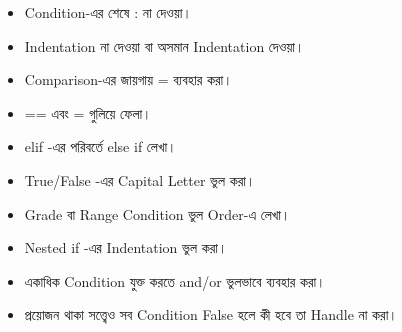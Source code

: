 

\begin{rememberbox}

\begin{itemize}

\item Condition-এর শেষে
\textenglish{\ttfamily :}
না দেওয়া।

\item Indentation না দেওয়া বা অসমান Indentation দেওয়া।

\item Comparison-এর জায়গায়
\textenglish{\ttfamily =}
ব্যবহার করা।

\item
\textenglish{\ttfamily ==}
এবং
\textenglish{\ttfamily =}
গুলিয়ে ফেলা।

\item
\textenglish{\ttfamily elif}
-এর পরিবর্তে
\textenglish{\ttfamily else if}
লেখা।

\item
\textenglish{\ttfamily True/False}
-এর Capital Letter ভুল করা।

\item Grade বা Range Condition ভুল Order-এ লেখা।

\item Nested
\textenglish{\ttfamily if}
-এর Indentation ভুল করা।

\item একাধিক Condition যুক্ত করতে
\textenglish{\ttfamily and/or}
ভুলভাবে ব্যবহার করা।

\item প্রয়োজন থাকা সত্ত্বেও সব Condition False হলে কী হবে তা
Handle না করা।

\end{itemize}

\end{rememberbox}


